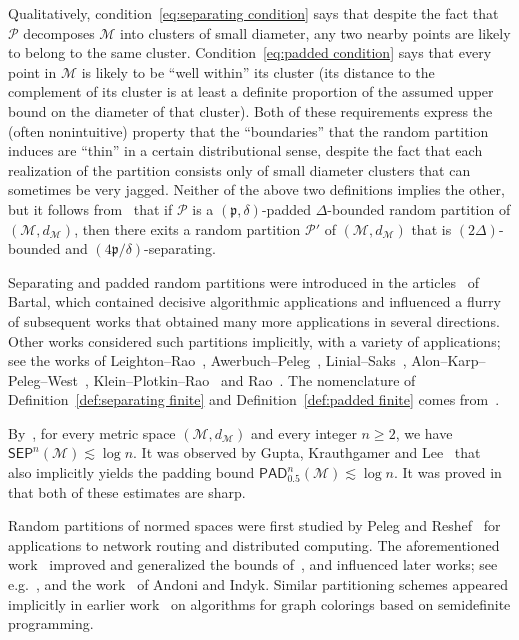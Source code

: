 \documentclass[11pt,reqno]{amsart}
\renewcommand{\ge}{\geqslant}
\renewcommand{\d}{\delta}
\theoremstyle{remark}
\newcommand{\MM}{\mathcal{M}}
\renewcommand{\1}{\mathbf 1}
\newcommand{\Part}{\mathscr{P}}
\newcommand{\sep}{\mathsf{SEP}}
\newcommand{\pad}{\mathsf{PAD}}
\begin{document}
Qualitatively, condition~\eqref{eq:separating condition} says that despite the fact that $\Part$ decomposes $\MM$ into clusters of small diameter, any two nearby points are likely to belong to the same cluster. Condition~\eqref{eq:padded condition} says that  every point in $\MM$ is likely to be ``well within'' its cluster (its distance to the complement of its cluster is at least a definite proportion of the assumed upper bound on the diameter of that cluster). Both of these requirements express the (often nonintuitive) property that  the ``boundaries'' that the random partition induces are ``thin'' in a certain distributional sense, despite the fact that each  realization of the partition consists only of small diameter clusters that can sometimes be very jagged. Neither of the above two definitions implies the other, but it follows from~\cite{LN03} that if $\Part$ is a $({\mathfrak{p}},\d)$-padded  $\Delta$-bounded random partition of $(\MM,d_\MM)$, then there exits  a random partition $\Part'$ of    $(\MM,d_\MM)$ that is $(2\Delta)$-bounded and $(4{\mathfrak{p}}/\d)$-separating.

Separating and padded random partitions  were introduced in the articles~\cite{Bar96,Bar98}  of Bartal, which contained decisive algorithmic applications and influenced a flurry of subsequent works that obtained many more applications in several directions. Other works considered such partitions implicitly, with a variety of applications; see the works of Leighton--Rao~\cite{LR88}, Awerbuch--Peleg~\cite{AP90}, Linial--Saks~\cite{LS91}, Alon--Karp--Peleg--West~\cite{AKPW91}, Klein--Plotkin--Rao~\cite{KPR93} and Rao~\cite{Rao99}. The nomenclature of Definition~\ref{def:separating finite}  and Definition~\ref{def:padded finite} comes from~\cite{GKL03,LN03,LN04,LN05,KLMN05}.

By~\cite{Bar96}, for every metric space $(\MM,d_\MM)$ and every integer $n\ge 2$, we have $\sep^n(\MM)\lesssim \log n$. It was observed by Gupta,  Krauthgamer and Lee~\cite{GKL03} that~\cite{Bar96} also implicitly yields the padding bound $\pad_{0.5}^n(\MM)\lesssim \log n$. It was proved in~\cite{Bar96} that both of these estimates are sharp.

Random partitions of normed spaces were first studied  by Peleg and Reshef~\cite{PR98} for applications to network routing and distributed
computing. The aforementioned work~\cite{CCGGP98} improved and generalized the bounds of~\cite{PR98}, and  influenced  later works; see
e.g.~\cite{LN05}, and the work~\cite{AI06} of Andoni and Indyk. Similar partitioning schemes appeared implicitly in earlier work~\cite{KMS98}
on  algorithms for graph colorings based on semidefinite programming.
\end{document}
